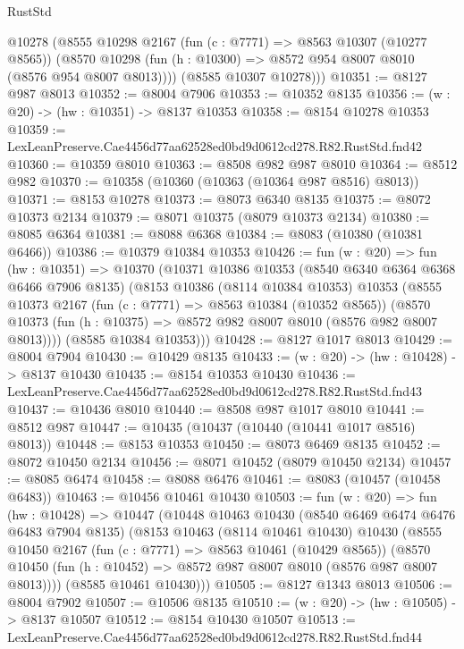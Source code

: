 \begin{lexlean}{RustStd}
\begin{coremodule}
        @10278
        (@8555
          @10298
          @2167
          (fun (c : @7771) => @8563 @10307 (@10277 @8565))
          (@8570 @10298 (fun (h : @10300) => @8572 @954 @8007 @8010 (@8576 @954 @8007 @8013))))
        (@8585 @10307 @10278)))
@10351 := @8127 @987 @8013
@10352 := @8004 @7906
@10353 := @10352 @8135
@10356 := (w : @20) -> (hw : @10351) -> @8137 @10353
@10358 := @8154 @10278 @10353
@10359 := LexLeanPreserve.Cae4456d77aa62528ed0bd9d0612cd278.R82.RustStd.fnd42
@10360 := @10359 @8010
@10363 := @8508 @982 @987 @8010
@10364 := @8512 @982
@10370 := @10358 (@10360 (@10363 (@10364 @987 @8516) @8013))
@10371 := @8153 @10278
@10373 := @8073 @6340 @8135
@10375 := @8072 @10373 @2134
@10379 := @8071 @10375 (@8079 @10373 @2134)
@10380 := @8085 @6364
@10381 := @8088 @6368
@10384 := @8083 (@10380 (@10381 @6466))
@10386 := @10379 @10384 @10353
@10426 := fun (w : @20) =>
  fun (hw : @10351) =>
  @10370
    (@10371
      @10386
      @10353
      (@8540 @6340 @6364 @6368 @6466 @7906 @8135)
      (@8153
        @10386
        (@8114 @10384 @10353)
        @10353
        (@8555
          @10373
          @2167
          (fun (c : @7771) => @8563 @10384 (@10352 @8565))
          (@8570 @10373 (fun (h : @10375) => @8572 @982 @8007 @8010 (@8576 @982 @8007 @8013))))
        (@8585 @10384 @10353)))
@10428 := @8127 @1017 @8013
@10429 := @8004 @7904
@10430 := @10429 @8135
@10433 := (w : @20) -> (hw : @10428) -> @8137 @10430
@10435 := @8154 @10353 @10430
@10436 := LexLeanPreserve.Cae4456d77aa62528ed0bd9d0612cd278.R82.RustStd.fnd43
@10437 := @10436 @8010
@10440 := @8508 @987 @1017 @8010
@10441 := @8512 @987
@10447 := @10435 (@10437 (@10440 (@10441 @1017 @8516) @8013))
@10448 := @8153 @10353
@10450 := @8073 @6469 @8135
@10452 := @8072 @10450 @2134
@10456 := @8071 @10452 (@8079 @10450 @2134)
@10457 := @8085 @6474
@10458 := @8088 @6476
@10461 := @8083 (@10457 (@10458 @6483))
@10463 := @10456 @10461 @10430
@10503 := fun (w : @20) =>
  fun (hw : @10428) =>
  @10447
    (@10448
      @10463
      @10430
      (@8540 @6469 @6474 @6476 @6483 @7904 @8135)
      (@8153
        @10463
        (@8114 @10461 @10430)
        @10430
        (@8555
          @10450
          @2167
          (fun (c : @7771) => @8563 @10461 (@10429 @8565))
          (@8570 @10450 (fun (h : @10452) => @8572 @987 @8007 @8010 (@8576 @987 @8007 @8013))))
        (@8585 @10461 @10430)))
@10505 := @8127 @1343 @8013
@10506 := @8004 @7902
@10507 := @10506 @8135
@10510 := (w : @20) -> (hw : @10505) -> @8137 @10507
@10512 := @8154 @10430 @10507
@10513 := LexLeanPreserve.Cae4456d77aa62528ed0bd9d0612cd278.R82.RustStd.fnd44

\end{coremodule}
\end{lexlean}
